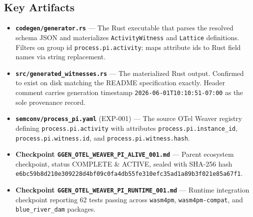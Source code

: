 \subsection{Key Artifacts}
\label{sec:otel-weaver-exp-004-registry-to-witness-artifacts}

\begin{itemize}
  \item \textbf{\texttt{codegen/generator.rs}} --- The Rust executable that parses the
    resolved schema JSON and materializes \texttt{ActivityWitness} and \texttt{Lattice}
    definitions. Filters on group id \texttt{process.pi.activity}; maps attribute ids to
    Rust field names via string replacement.
  \item \textbf{\texttt{src/generated\_witnesses.rs}} --- The materialized Rust output.
    Confirmed to exist on disk matching the README specification exactly. Header comment
    carries generation timestamp \texttt{2026-06-01T10:10:51-07:00} as the sole provenance
    record.
  \item \textbf{\texttt{semconv/process\_pi.yaml}} (EXP-001) --- The source OTel Weaver
    registry defining \texttt{process.pi.activity} with attributes
    \texttt{process.pi.instance\_id}, \texttt{process.pi.witness.id}, and
    \texttt{process.pi.witness.hash}.
  \item \textbf{Checkpoint \texttt{GGEN\_OTEL\_WEAVER\_PI\_ALIVE\_001.md}} --- Parent
    ecosystem checkpoint, status COMPLETE \& ACTIVE, sealed with SHA-256 hash
    \texttt{e6bc59b8d210e309228d4bf09c0fa4db55fe310efc35ad1a89b3f021e85a67f1}.
  \item \textbf{Checkpoint \texttt{GGEN\_OTEL\_WEAVER\_PI\_RUNTIME\_001.md}} --- Runtime
    integration checkpoint reporting 62 tests passing across \texttt{wasm4pm},
    \texttt{wasm4pm-compat}, and \texttt{blue\_river\_dam} packages.
\end{itemize}
